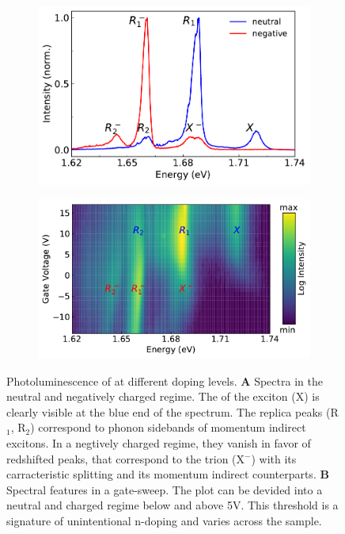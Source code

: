 \begin{figure}[h]
	\begin{subfigure}{0.49\textwidth}
		\caption{}
		\includegraphics[height=0.65\textwidth]{spectrum_neutral_negative}
	\end{subfigure}
	\begin{subfigure}{0.49\textwidth}
		\caption{}
		\includegraphics[height=0.65\textwidth]{Voltsweep}
	\end{subfigure}
	\caption{Photoluminescence of \wse at different doping levels. \textbf{A} Spectra in the neutral and negatively charged regime. The \pl of the exciton (X) is clearly visible at the blue end of the spectrum. The replica peaks (R$_1$, R$_2$) correspond to phonon sidebands of momentum indirect excitons. In a negtively charged regime, they vanish in favor of redshifted peaks, that correspond to the trion (X$^-$) with its carracteristic splitting and its momentum indirect counterparts. \textbf{B} Spectral features in a gate-sweep. The plot can be devided into a neutral and charged regime below and above 5V. This threshold is a signature of unintentional n-doping and varies across the sample.}\label{plspectrum}
\end{figure} 

